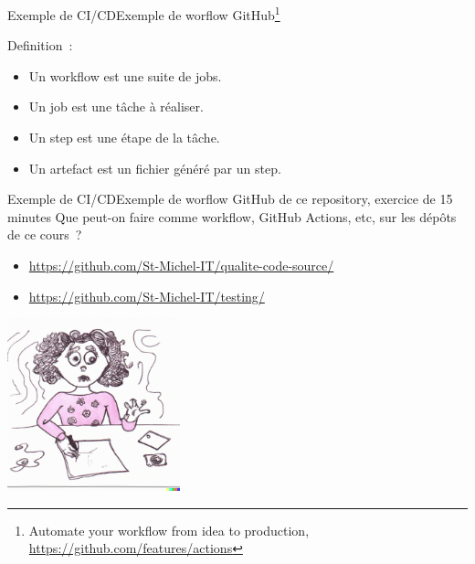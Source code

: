 \documentclass{beamer}
\begin{document}
    \begin{frame}{Exemple de CI/CD}{Exemple de worflow GitHub{\footnote{Automate your workflow from idea to production, \url{https://github.com/features/actions}}}}
        \transdissolve

        Definition~:
        \begin{itemize}
            \item Un workflow est une suite de jobs.
            \item Un job est une tâche à réaliser.
            \item Un step est une étape de la tâche.
            \item Un artefact est un fichier généré par un step.
        \end{itemize}
    \end{frame}

    \begin{frame}{Exemple de CI/CD}{Exemple de worflow GitHub de ce repository, exercice de 15 minutes}
        \transdissolve
        Que peut-on faire comme workflow, GitHub Actions, etc, sur les dépôts de ce cours~?
        \begin{itemize}
            \item \url{https://github.com/St-Michel-IT/qualite-code-source/}
            \item \url{https://github.com/St-Michel-IT/testing/}
        \end{itemize}
        \bigbreak
        \centering
        \includegraphics[width=5cm]{image/young-praticing-her-homework}
    \end{frame}
\end{document}
